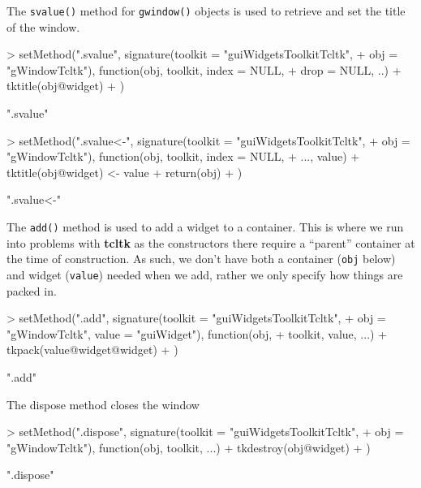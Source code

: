 \documentclass[12pt]{article}
\newcommand{\RCode}[1]{\texttt{#1}}
\newcommand{\RFunc}[1]{\texttt{#1()}}
\newcommand{\RPackage}[1]{\textbf{#1}}
\begin{document}
The \RFunc{svalue} method for \RFunc{gwindow} objects is used to
retrieve and set the title of the window. 

\begin{Schunk}
\begin{Sinput}
> setMethod(".svalue", signature(toolkit = "guiWidgetsToolkitTcltk", 
+     obj = "gWindowTcltk"), function(obj, toolkit, index = NULL, 
+     drop = NULL, ..) {
+     tktitle(obj@widget)
+ })
\end{Sinput}
\begin{Soutput}
[1] ".svalue"
\end{Soutput}
\begin{Sinput}
> setMethod(".svalue<-", signature(toolkit = "guiWidgetsToolkitTcltk", 
+     obj = "gWindowTcltk"), function(obj, toolkit, index = NULL, 
+     ..., value) {
+     tktitle(obj@widget) <- value
+     return(obj)
+ })
\end{Sinput}
\begin{Soutput}
[1] ".svalue<-"
\end{Soutput}
\end{Schunk}

The \RFunc{add} method is used to add a widget to a container. This is
where we run into problems with \RPackage{tcltk} as the constructors
there require a ``parent'' container at the time of construction. As
such, we don't have both a container (\RCode{obj} below) and  widget
(\RCode{value}) needed when we add, rather we only specify how things
are packed in.

\begin{Schunk}
\begin{Sinput}
> setMethod(".add", signature(toolkit = "guiWidgetsToolkitTcltk", 
+     obj = "gWindowTcltk", value = "guiWidget"), function(obj, 
+     toolkit, value, ...) {
+     tkpack(value@widget@widget)
+ })
\end{Sinput}
\begin{Soutput}
[1] ".add"
\end{Soutput}
\end{Schunk}

The dispose method closes the window
\begin{Schunk}
\begin{Sinput}
> setMethod(".dispose", signature(toolkit = "guiWidgetsToolkitTcltk", 
+     obj = "gWindowTcltk"), function(obj, toolkit, ...) {
+     tkdestroy(obj@widget)
+ })
\end{Sinput}
\begin{Soutput}
[1] ".dispose"
\end{Soutput}
\end{Schunk}
\end{document}
